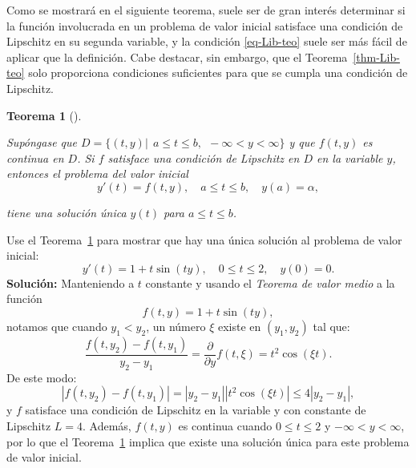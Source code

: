 \documentclass[
  spanish,
  us-letterpaper,
]{scrreprt}
\theoremstyle{definition}
\theoremstyle{plain}
\newtheorem{theorem}{Teorema}[chapter]
\theoremstyle{remark}
\begin{document}
Como se mostrará en el siguiente teorema, suele ser de gran interés
determinar si la función involucrada en un problema de valor inicial
satisface una condición de Lipschitz en su segunda variable, y la
condición \ref{eq-Lib-teo} suele ser más fácil de aplicar que la
definición. Cabe destacar, sin embargo, que el Teorema~\ref{thm-Lib-teo}
solo proporciona condiciones suficientes para que se cumpla una
condición de Lipschitz.

\begin{theorem}[]\protect\hypertarget{thm-uniq-sol}{}\label{thm-uniq-sol}

Supóngase que
\(D = \{(t, y) | \ \ a \leq t \leq b, \ \  -\infty < y < \infty \}\) y
que \(f (t, y)\) es continua en \(D\). Si \(f\) satisface una condición
de Lipschitz en \(D\) en la variable \(y\), entonces el problema del
valor inicial \[
y'(t)= f(t,y), \quad a\leq t \leq b, \quad y(a) = \alpha,
\]

tiene una solución única \(y(t)\) para \(a\leq t \leq b\).

\end{theorem}

\begin{tcolorbox}[enhanced jigsaw, title={Ejemplo}, left=2mm, leftrule=.75mm, coltitle=black, opacityback=0, colback=white, titlerule=0mm, toprule=.15mm, opacitybacktitle=0.6, colframe=quarto-callout-caution-color-frame, bottomtitle=1mm, colbacktitle=quarto-callout-caution-color!10!white, rightrule=.15mm, arc=.35mm, breakable, toptitle=1mm, bottomrule=.15mm]

Use el Teorema~\ref{thm-uniq-sol} para mostrar que hay una única
solución al problema de valor inicial: \[
y'(t)= 1 + t\sin(ty), \quad 0\leq t \leq 2, \quad y(0) = 0.
\] \textbf{Solución:} Manteniendo a \(t\) constante y usando el
\emph{Teorema de valor medio} a la función \[
f(t,y) = 1 + t\sin(ty),
\] notamos que cuando \(y_1<y_2\), un número \(\xi\) existe en
\((y_1,y_2)\) tal que: \[
\dfrac{f(t,y_2)-f(t,y_1)}{y_2-y_1} = \dfrac{\partial}{\partial y} f(t,\xi) = t^2\cos(\xi t).
\] De este modo: \[
|f(t,y_2)-f(t,y_1)| = |y_2-y_1||t^2\cos(\xi t)| \leq 4|y_2-y_1|,
\] y \(f\) satisface una condición de Lipschitz en la variable y con
constante de Lipschitz \(L = 4\). Además, \(f(t, y)\) es continua cuando
\(0 ≤ t ≤ 2\) y \(−∞ < y < ∞\), por lo que el Teorema~\ref{thm-uniq-sol}
implica que existe una solución única para este problema de valor
inicial.

\end{tcolorbox}
\end{document}
